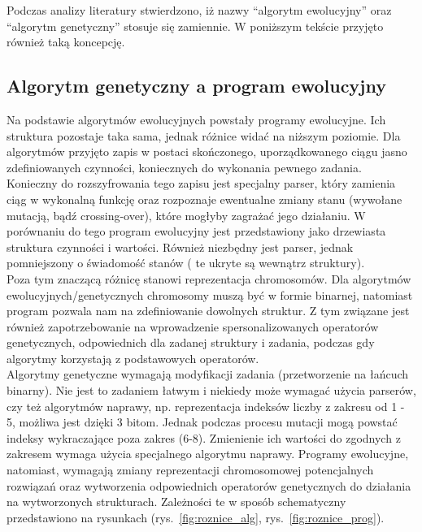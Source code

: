 \documentclass[twoside,a4paper,10]{book}
\begin{document}
Podczas  analizy literatury stwierdzono, iż nazwy \enquote{algorytm ewolucyjny}  oraz \enquote{algorytm  genetyczny} stosuje się zamiennie. W  poniższym tekście  przyjęto również taką koncepcję. 

\subsection{ Algorytm genetyczny a program ewolucyjny}
 Na podstawie algorytmów ewolucyjnych powstały programy ewolucyjne. Ich struktura pozostaje taka sama, jednak różnice widać na niższym poziomie. 
Dla algorytmów przyjęto zapis w postaci skończonego, uporządkowanego ciągu  jasno zdefiniowanych czynności, koniecznych do wykonania pewnego zadania. Konieczny do rozszyfrowania tego zapisu jest specjalny parser, który zamienia ciąg w wykonalną funkcję oraz rozpoznaje ewentualne zmiany stanu (wywołane mutacją, bądź crossing-over), które mogłyby zagrażać jego działaniu.  W porównaniu do tego program ewolucyjny jest przedstawiony jako  drzewiasta struktura czynności i wartości. Również niezbędny jest parser, jednak pomniejszony o świadomość stanów ( te ukryte są wewnątrz struktury). 
\\
Poza tym znaczącą różnicę stanowi reprezentacja chromosomów. Dla algorytmów ewolucyjnych/genetycznych chromosomy muszą być w formie binarnej, natomiast program pozwala nam na zdefiniowanie dowolnych struktur.
Z tym związane jest również zapotrzebowanie na wprowadzenie spersonalizowanych operatorów genetycznych, odpowiednich dla zadanej struktury i zadania, podczas gdy algorytmy korzystają z podstawowych operatorów.
\\
Algorytmy genetyczne wymagają modyfikacji zadania (przetworzenie na łańcuch binarny). Nie jest to zadaniem łatwym i niekiedy może wymagać użycia parserów, czy też algorytmów naprawy, np. reprezentacja indeksów liczby z zakresu od 1 - 5, możliwa jest dzięki 3 bitom. Jednak podczas procesu mutacji mogą powstać indeksy wykraczające poza zakres (6-8). Zmienienie ich wartości do zgodnych z zakresem wymaga użycia specjalnego algorytmu naprawy. 
Programy ewolucyjne, natomiast,  wymagają zmiany reprezentacji chromosomowej potencjalnych rozwiązań oraz wytworzenia odpowiednich operatorów genetycznych do działania na wytworzonych strukturach.  Zależności te w sposób schematyczny przedstawiono na rysunkach (rys.~\ref{fig:roznice_alg}, rys.~\ref{fig:roznice_prog}).
\end{document}
